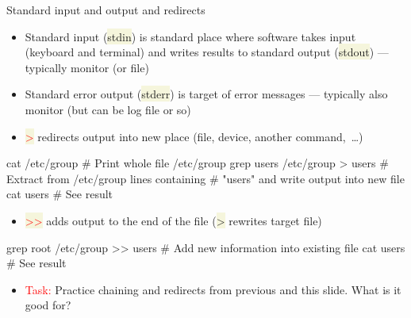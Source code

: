 \documentclass[compress, ucs, xelatex, 11pt, xcolor=svgnames, aspectratio=169,
	hyperref={
		bookmarks=true,
		unicode=true,
		colorlinks=true,
		pdftitle={Linux, command line and MetaCentrum},
		plainpages=false,
		pdfauthor={Vojtech Zeisek},
		pdfsubject={Course about use of Linux command line, writing shell scripts and using MetaCentrum of CESNET},
		pdfcreator={XeLaTeX},
		pdfkeywords={Linux, GNU, BASH, shell, command line, MetaCentrum},
		linkcolor=DarkRed, %
		anchorcolor=DarkBlue, %
		citecolor=Indigo, %
		filecolor=NavyBlue, %
		menucolor=DarkMagenta, %
		urlcolor=DarkBlue, %
		pdftex},
	url={hyphens, lowtilde} %
	]{beamer}
\renewcommand{\texttt}[1]{\colorbox{Beige}{{\ttfamily #1}}}
\renewcommand{\alert}[1]{\textcolor{red}{#1}}
\begin{document}
\begin{frame}[fragile]{Standard input and output and redirects}
	\begin{itemize}
		\item Standard input (\texttt{stdin}) is standard place where software takes input (keyboard and terminal) and writes results to standard output (\texttt{stdout}) --- typically monitor (or file)
		\item Standard error output (\texttt{stderr}) is target of error messages --- typically also monitor (but can be log file or so)
		\item \alert{\texttt{\textgreater}} redirects output into new place (file, device, another command,~\ldots)
	\end{itemize}
	\vfill
	\begin{bashcode}
    cat /etc/group # Print whole file /etc/group
    grep users /etc/group > users # Extract from /etc/group lines containing
                                  # "users" and write output into new file
    cat users # See result
	\end{bashcode}
	\vfill
	\begin{itemize}
		\item \alert{\texttt{\textgreater\textgreater}} adds output to the end of the file (\texttt{\textgreater} rewrites target file)
	\end{itemize}
	\vfill
	\begin{bashcode}
    grep root /etc/group >> users # Add new information into existing file
    cat users # See result
	\end{bashcode}
	\vfill
	\begin{itemize}
		\item \alert{Task:} Practice chaining and redirects from previous and this slide. What is it good for?
	\end{itemize}
\end{frame}
\end{document}
